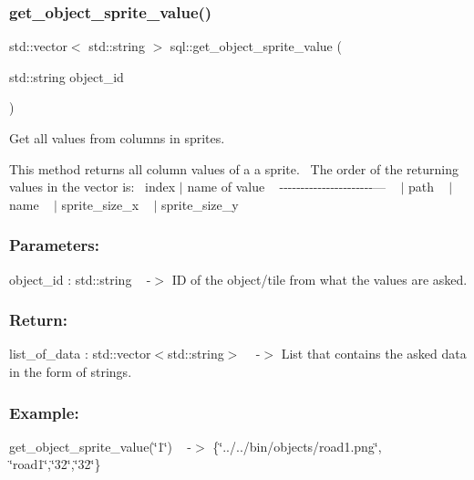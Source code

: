 \subsubsection{\texorpdfstring{get\+\_\+object\+\_\+sprite\+\_\+value()}{get\_object\_sprite\_value()}}
{\footnotesize\ttfamily std\+::vector$<$ std\+::string $>$ sql\+::get\+\_\+object\+\_\+sprite\+\_\+value (\begin{DoxyParamCaption}\item[{std\+::string}]{object\+\_\+id }\end{DoxyParamCaption})}



Get all values from columns in sprites. 

This method returns all column values of a a sprite.~\newline
The order of the returning values in the vector is\+:~\newline
 index $\vert$ name of value ~\newline
-\/-\/-\/-\/-\/-\/-\/-\/-\/-\/-\/-\/-\/-\/-\/-\/-\/-\/-\/-\/-\/-\/--- ~ $\vert$ path ~ $\vert$ name ~ $\vert$ sprite\+\_\+size\+\_\+x ~ $\vert$ sprite\+\_\+size\+\_\+y ~\newline


\subsubsection*{Parameters\+: }

object\+\_\+id \+: std\+::string ~\newline
-\/$>$ ID of the object/tile from what the values are asked.

\subsubsection*{Return\+: }

list\+\_\+of\+\_\+data \+: std\+::vector$<$std\+::string$>$ ~\newline
-\/$>$ List that contains the asked data in the form of strings.

\subsubsection*{Example\+: }

get\+\_\+object\+\_\+sprite\+\_\+value(\char`\"{}1\char`\"{}) ~\newline
-\/$>$ \{\char`\"{}../../bin/objects/road1.\+png\char`\"{}, \char`\"{}road1\char`\"{},\char`\"{}32\char`\"{},\char`\"{}32\char`\"{}\} 

